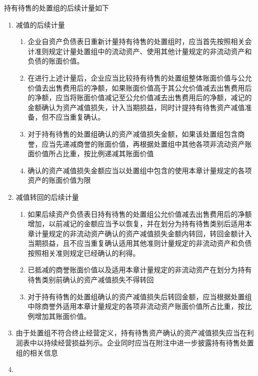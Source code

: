 \documentclass[UTF8,12pt]{ctexart}
\numberwithin{equation}{section} %
\numberwithin{figure}{section}
\numberwithin{table}{section}
\begin{document}
	持有待售的处置组的后续计量如下
	\begin{enumerate}
		\item 减值的后续计量
		\begin{enumerate}
			\item 企业自资产负债表日重新计量持有待售的处置组时，应当首先按照相关会计准则规定计量处置组中的流动资产、使用其他计量规定的非流动资产和负债的账面价值。
			
			\item 在进行上述计量后，企业应当比较持有待售的处置组整体账面价值与公允价值去出售费用后的净额，如果账面价值高于其公允价值减去出售费用后的净额，应当将账面价值减记至公允价值减去出售费用后的净额，减记的金额确认为资产减值损失，计入当期损益，同时计提持有待售资产减值准备，但不应当重复确认。
			
			\item 对于持有待售的处置组确认的资产减值损失金额，如果该处置组包含商誉，应当先递减商誉的账面价值，再根据处置组中其他各项非流动资产账面价值所占比重，按比例递减其账面价值
			
			\item 确认的资产减值损失金额应当以处置组中包含的使用本章计量规定的各项资产的账面价值为限
		\end{enumerate}
		
		\item 减值转回的后续计量
		\begin{enumerate}
			\item 如果后续资产负债表日持有待售的处置组公允价值减去出售费用后的净额增加，以前减记的金额应当予以恢复，并在划分为持有待售类别后适用本章计量规定的非流动资产确认的资产减值损失金额内转回，转回金额计入当期损益，且不应当重复确认适用其他准则计量规定的非流动资产和负债按照相关准则规定已经确认的利得。
			
			\item 已抵减的商誉账面价值以及适用本章计量规定的非流动资产在划分为持有待售类别前确认的资产减值损失不得转回
			
			\item 对于持有待售的处置组确认的资产减值损失后转回金额，应当根据处置组中除商誉外适用本章计量规定的各项非流动资产账面价值所占比重，按比例增加其账面价值。
		\end{enumerate}
		
		\item 由于处置组不符合终止经营定义，持有待售资产确认的资产减值损失应当在利润表中以持续经营损益列示。企业同时应当在附注中进一步披露持有待售处置组的相关信息
		
		\item 
	\end{enumerate}
	
\end{document}
